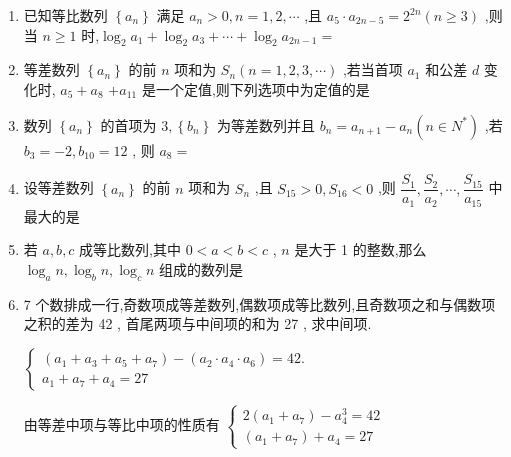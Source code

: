 \begin{enumerate}
    \item 已知等比数列 $ \left\{  {a}_{n}\right\} $ 满足 $ {a}_{n} > 0,n = 1,2,\cdots $ ,且 $ {a}_{5} \cdot  {a}_{{2n} - 5} = {2}^{2n}\left( {n \geq  3}\right) $ ,则当 $ n \geq  1 $ 时,$ {\log }_{2}{a}_{1} + {\log }_{2}{a}_{3} + \cdots  + {\log }_{2}{a}_{{2n} - 1} = $ 

    \item 等差数列 $\left\{  {a}_{n}\right\}$ 的前 $n$ 项和为 ${S}_{n}\left( {n = 1,2,3,\cdots }\right)$ ,若当首项 ${a}_{1}$ 和公差 $d$ 变化时, ${a}_{5} + {a}_{8}$  $+ {a}_{11}$ 是一个定值,则下列选项中为定值的是 
    
    \item 数列 $\left\{  {a}_{n}\right\}$ 的首项为 $3,\left\{  {b}_{n}\right\}$ 为等差数列并且 ${b}_{n} = {a}_{n + 1} - {a}_{n}\left( {n \in  {N}^{ * }}\right)$ ,若 ${b}_{3} =  - 2,{b}_{10} = {12}$ , 则 ${a}_{8} =$ 
    
    \item 设等差数列 $\left\{  {a}_{n}\right\}$ 的前 $n$ 项和为 ${S}_{n}$ ,且 ${S}_{15} > 0,{S}_{16} < 0$ ,则 $\dfrac{{S}_{1}}{{a}_{1}},\dfrac{{S}_{2}}{{a}_{2}},\cdots ,\dfrac{{S}_{15}}{{a}_{15}}$ 中最大的是      

    \item 若 $ a,b,c $ 成等比数列,其中 $ 0 < a < b < c $ , $ n $ 是大于 1 的整数,那么$ {\log }_{a}n,{\log }_{b}n,{\log }_{c}n $ 组成的数列是

    \item 7 个数排成一行,奇数项成等差数列,偶数项成等比数列,且奇数项之和与偶数项之积的差为 42 , 首尾两项与中间项的和为 27 , 求中间项.
    \begin{jieda}
    
        $ \left\{  \begin{array}{l} \left( {{a}_{1} + {a}_{3} + {a}_{5} + {a}_{7}}\right)  - \left( {{a}_{2} \cdot  {a}_{4} \cdot  {a}_{6}}\right)  = {42}. \\  {a}_{1} + {a}_{7} + {a}_{4} = {27} \end{array}\right. $
        
        由等差中项与等比中项的性质有
        $ \left\{  \begin{array}{l} 2\left( {{a}_{1} + {a}_{7}}\right)  - {a}_{4}^{3} = {42} \\  \left( {{a}_{1} + {a}_{7}}\right)  + {a}_{4} = {27}\end{array}\right. $ 
        

\end{jieda}
\end{enumerate}
